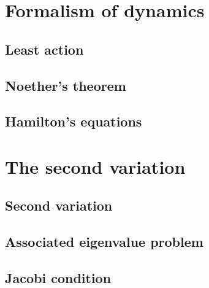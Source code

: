 \documentclass{article}
\begin{document}
\section{Formalism of dynamics}
\subsection{Least action}
\subsection{Noether's theorem}
\subsection{Hamilton's equations}

\section{The second variation}
\subsection{Second variation}
\subsection{Associated eigenvalue problem}
\subsection{Jacobi condition}
\end{document}
